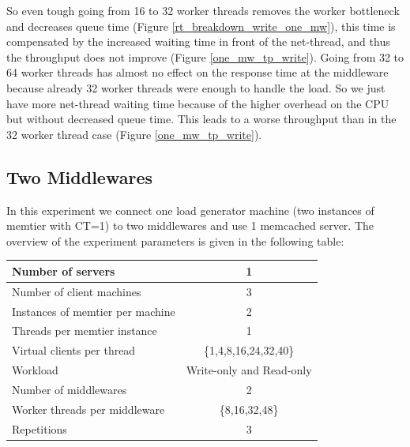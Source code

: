 So even tough going from 16 to 32 worker threads removes the worker bottleneck and decreases queue time (Figure \ref{rt_breakdown_write_one_mw}), this time is compensated by the increased waiting time in front of the net-thread, and thus the throughput does not improve (Figure \ref{one_mw_tp_write}). Going from 32 to 64 worker threads has almost no effect on the response time at the middleware because already 32 worker threads were enough to handle the load. So we just have more net-thread waiting time because of the higher overhead on the CPU but without decreased queue time. This leads to a worse throughput than in the 32 worker thread case (Figure \ref{one_mw_tp_write}).


\subsection{Two Middlewares} \label{sec:baselineWithMWTwo}
In this experiment we connect one load generator machine (two instances of memtier with CT=1) to two middlewares and use 1 memcached server. 
The overview of the experiment parameters is given in the following table:
\begin{center}
	\scriptsize{
		\begin{tabular}{|l|c|}
			\hline Number of servers                & 1                        \\ 
			\hline Number of client machines        & 3                        \\ 
			\hline Instances of memtier per machine & 2                        \\ 
			\hline Threads per memtier instance     & 1                        \\
			\hline Virtual clients per thread       & \{1,4,8,16,24,32,40\}       \\ 
			\hline Workload                         & Write-only and Read-only \\
			\hline Number of middlewares            & 2                        \\
			\hline Worker threads per middleware    & \{8,16,32,48\}              \\
			\hline Repetitions                      & 3                        \\ 
			\hline 
		\end{tabular}
	} 
\end{center}

